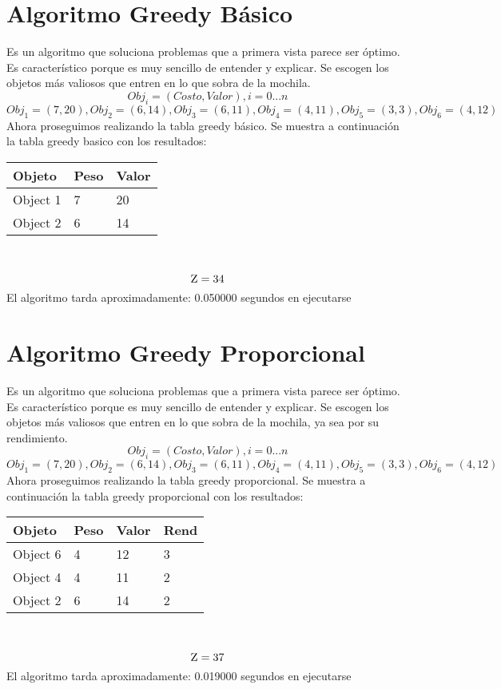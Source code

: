 \documentclass[10pt,letterpaper]{article}
\begin{document}
\section{Algoritmo Greedy Básico} 
        Es un algoritmo que soluciona problemas que a primera vista parece ser 
        óptimo. Es característico porque es muy sencillo de entender y explicar. 
        Se escogen los objetos más valiosos que entren en lo que sobra de la mochila. 
        \[ Obj_{i} = (Costo, Valor), i = 0...n \]
\[ Obj_{1} = (7, 20), Obj_{2} = (6, 14), Obj_{3} = (6, 11), Obj_{4} = (4, 11), Obj_{5} = (3, 3), Obj_{6} = (4, 12) \]
\newline Ahora proseguimos realizando la tabla greedy básico.
Se muestra a continuación la tabla greedy basico con los resultados: 
\begin{center}
\begin{tabu} to 0.6\textwidth { | X[l] | X[l] | X[l] | } 
\hline
{}
\textbf{Objeto} & \textbf{Peso} & \textbf{Valor}\\
\hline
Object 1 & 7 & 20 \\
\hline
Object 2 & 6 & 14 \\
\hline
\end{tabu} \\
\end{center}
\[ \textsc{\normalsize Z}\\[0.5cm] = 34 \] 
\newline El algoritmo tarda aproximadamente: 0.050000 segundos en ejecutarse
\section{Algoritmo Greedy Proporcional} 
        Es un algoritmo que soluciona problemas que a primera vista parece ser 
        óptimo. Es característico porque es muy sencillo de entender y explicar. 
        Se escogen los objetos más valiosos que entren en lo que sobra de la mochila, ya sea por su rendimiento. 
        \[ Obj_{i} = (Costo, Valor), i = 0...n \]
\[ Obj_{1} = (7, 20), Obj_{2} = (6, 14), Obj_{3} = (6, 11), Obj_{4} = (4, 11), Obj_{5} = (3, 3), Obj_{6} = (4, 12) \]
\newline Ahora proseguimos realizando la tabla greedy proporcional.
Se muestra a continuación la tabla greedy proporcional con los resultados: 
\begin{center}
\begin{tabu} to 0.6\textwidth { | X[l] | X[l] | X[l] | X[l] |} 
\hline
{}
\textbf{Objeto} & \textbf{Peso} & \textbf{Valor} & \textbf{Rend}\\
\hline
Object 6 & 4 & 12 & 3 \\
\hline
Object 4 & 4 & 11 & 2 \\
\hline
Object 2 & 6 & 14 & 2 \\
\hline
\end{tabu} \\
\end{center}
\[ \textsc{\normalsize Z}\\[0.5cm] = 37 \] 
\newline El algoritmo tarda aproximadamente: 0.019000 segundos en ejecutarse
\end{document}
